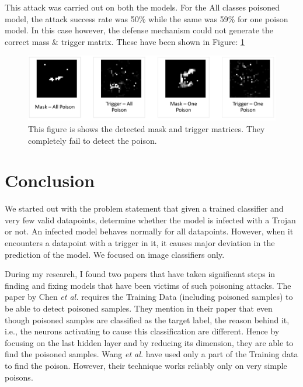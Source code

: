 \documentclass{article}
\newcommand{\etal}[0]{\emph{et al.}}
\newcommand{\fig}[1]{Figure: #1}
\begin{document}
This attack was carried out on both the models. For the All classes poisoned model, the attack success rate was 50\% while the same was 59\% for one poison model. In this case however, the defense mechanism could not generate the correct mass \& trigger matrix. These have been shown in \fig{\ref{fig:E4b}}
\begin{figure}[h]
    \centering
    \includegraphics[width=.75\textwidth]{E4b.PNG}
    \caption{This figure is shows the detected mask and trigger matrices. They completely fail to detect the poison.}
    \label{fig:E4b}
\end{figure}

\section{Conclusion}
We started out with the problem statement that given a trained classifier and very few valid datapoints, determine whether the model is infected with a Trojan or not. An infected model behaves normally for all datapoints. However, when it encounters a datapoint with a trigger in it, it causes major deviation in the prediction of the model. We focused on image classifiers only.

During my research, I found two papers that have taken significant steps in finding and fixing models that have been victims of such poisoning attacks. The paper by Chen \etal \cite{chenDetectingBackdoorAttacks2018} requires the Training Data (including poisoned samples) to be able to detect poisoned samples. They mention in their paper that even though poisoned samples are classified as the target label, the reason behind it, i.e., the neurons activating to cause this classification are different. Hence by focusing on the last hidden layer and by reducing its dimension, they are able to find the poisoned samples. Wang \etal \cite{wangNeuralCleanseIdentifying} have used only a part of the Training data to find the poison. However, their technique works reliably only on very simple poisons. 
\newpage


\end{document}
